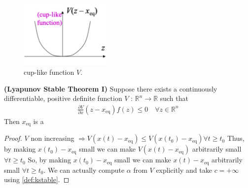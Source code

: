 \documentclass{article}
\newcommand{\bfs}[1]{\textbf{({#1}) }}
\begin{document}
\begin{figure}[H]
    \centering
    \includegraphics[width=0.4\textwidth]{Figs/9.png}
    \caption{cup-like function $V$.}
    \label{fig:V}
\end{figure}
\begin{thma}\bfs{Lyapunov Stable Theorem I}
Suppose there exists a continuously differentiable, positive definite function $V$ : $\mathbb{R}^{n} \rightarrow \mathbb{R}$ such that
\begin{align*}
\frac{\partial V}{\partial x}\left(z-x_{\mathrm{eq}}\right) f(z) \leq 0 \quad \forall z \in \mathbb{R}^{n}
\end{align*}
Then $x_{\mathrm{eq}}$ is a 
\end{thma}
\begin{proof}
$V$ non increasing $\Rightarrow V\left(x(t)-x_{\mathrm{eq}}\right) \leq V\left(x\left(t_{0}\right)-x_{\mathrm{eq}}\right) \forall t \geq t_{0}$
Thus, by making $x\left(t_{0}\right)-x_{\mathrm{eq}}$ small we can make $V\left(x(t)-x_{\mathrm{eq}}\right)$ arbitrarily small $\forall t \geq t_{0}$ So, by making $x\left(t_{0}\right)-x_{\mathrm{eq}}$ small we can make $x(t)-x_{\mathrm{eq}}$ arbitrarily small $\forall t \geq t_{0}$. We can actually compute $\alpha$ from $V$ explicitly and take $c=+\infty$ using \cref{def:kstable}.
\end{proof}
\end{document}
